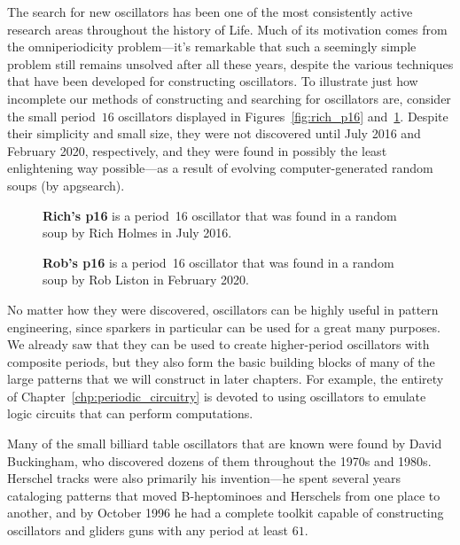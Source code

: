 The search for new oscillators has been one of the most consistently active research areas throughout the history of Life. Much of its motivation comes from the omniperiodicity problem---it's remarkable that such a seemingly simple problem still remains unsolved after all these years, despite the various techniques that have been developed for constructing oscillators. To illustrate just how incomplete our methods of constructing and searching for oscillators are, consider the small period~$16$ oscillators displayed in Figures~\ref{fig:rich_p16} and~\ref{fig:rob_p16}. Despite their simplicity and small size, they were not discovered until July 2016 and February 2020, respectively, and they were found in possibly the least enlightening way possible---as a result of evolving computer-generated random soups (by apgsearch).

\begin{figure}[!htb]
	\centering
	\begin{minipage}[b]{.48\textwidth}
		\centering
		\caption{\textbf{Rich's p16} is a period~16 oscillator that was found in a random soup by Rich Holmes in July 2016.}\label{fig:rich_p16}
	\end{minipage} \hfill %
	\begin{minipage}[b]{.48\textwidth}
		\centering
		\caption{\textbf{Rob's p16} is a period~16 oscillator that was found in a random soup by Rob Liston in February 2020.}\label{fig:rob_p16}
	\end{minipage}
\end{figure}

No matter how they were discovered, oscillators can be highly useful in pattern engineering, since sparkers in particular can be used for a great many purposes. We already saw that they can be used to create higher-period oscillators with composite periods, but they also form the basic building blocks of many of the large patterns that we will construct in later chapters. For example, the entirety of Chapter~\ref{chp:periodic_circuitry} is devoted to using oscillators to emulate logic circuits that can perform computations.

Many of the small billiard table oscillators that are known were found by David Buckingham, who discovered dozens of them throughout the 1970s and 1980s. Herschel tracks were also primarily his invention---he spent several years cataloging patterns that moved B-heptominoes and Herschels from one place to another, and by October 1996 he had a complete toolkit capable of constructing oscillators and gliders guns with any period at least $61$.

